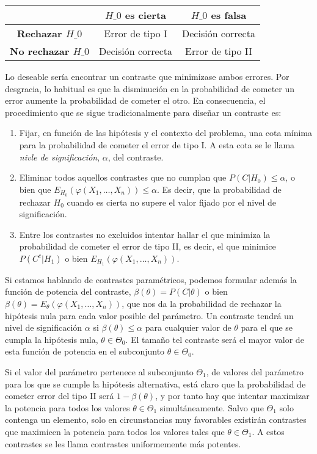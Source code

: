 \begin{tabular}{|c|c|c|}
\hline 
 & \textbf{$H\_0$ es cierta} & \textbf{$H\_0$ es falsa} \tabularnewline
\hline 
\hline 
\textbf{Rechazar $H\_0$} & Error de tipo I & Decisi\'on correcta\tabularnewline
\hline 
\textbf{No rechazar $H\_0$}  & Decisi\'on correcta & Error de tipo II\tabularnewline
\hline 
\end{tabular}

Lo deseable ser\'ia encontrar un contraste que minimizase ambos errores. Por desgracia, lo habitual es que la disminuci\'on en la probabilidad de cometer un error aumente la probabilidad de cometer el otro. En consecuencia, el procedimiento que se sigue tradicionalmente para dise\~nar un contraste es:
\begin{enumerate}
\item Fijar, en funci\'on de las hip\'otesis y el contexto del problema, una cota m\'inima para la probabilidad de cometer el error de tipo I. A esta cota se le llama \textit{nivle de significaci\'on}, $\alpha$, del contraste.
\item Eliminar todos aquellos contrastes que no cumplan que $P(C|H_0)\leq\alpha$, o bien que $E_{H_0}(\varphi(X_1,\ldots,X_n))\leq\alpha$. Es decir, que la probabilidad de rechazar $H_0$ cuando es cierta no supere el valor fijado por el nivel de significaci\'on.
\item Entre los contrastes no excluidos intentar hallar el que minimiza la probabilidad de cometer el error de tipo II, es decir, el que minimice $P(C^c|H_1)$ o bien $E_{H_1}(\varphi(X_1,\ldots,X_n))$.
\end{enumerate}


Si estamos hablando de contrastes param\'etricos, podemos formular adem\'as la funci\'on de potencia del contraste, $\beta(\theta)=P(C|\theta)$ o bien $\beta(\theta)=E_{\theta}(\varphi(X_1,\ldots,X_n))$, que nos da la probabilidad de rechazar la hip\'otesis nula para cada valor posible del par\'ametro. Un contraste tendr\'a un nivel de significaci\'on $\alpha$ si $\beta(\theta)\leq\alpha$ para cualquier valor de $\theta$ para el que se cumpla la hip\'otesis nula, $\theta\in\Theta_0$. El tama\~no tel contraste ser\'a el mayor valor de esta funci\'on de potencia en el subconjunto $\theta\in\Theta_0$.

Si el valor del par\'ametro pertenece al subconjunto $\Theta_1$, de valores del par\'ametro para los que se cumple la hip\'otesis alternativa, est\'a claro que la probabilidad de cometer error del tipo II ser\'a $1-\beta(\theta)$, y por tanto hay que intentar maximizar la potencia para todos los valores $\theta\in\Theta_1$ simult\'aneamente. Salvo que $\Theta_1$ solo contenga un elemento, solo en circunstancias muy favorables existir\'an contrastes que maximicen la potencia para todos los valores tales que $\theta\in\Theta_1$. A estos contrastes se les llama contrastes uniformemente m\'as potentes.

